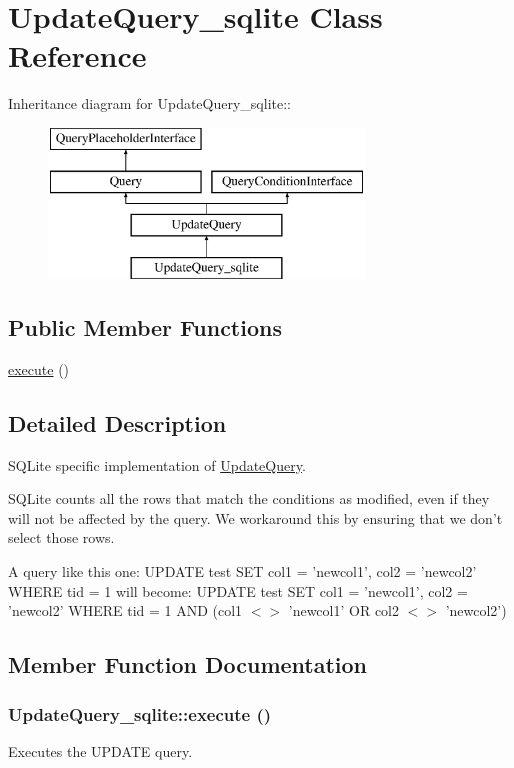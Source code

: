 \hypertarget{classUpdateQuery__sqlite}{
\section{UpdateQuery\_\-sqlite Class Reference}
\label{classUpdateQuery__sqlite}
}
Inheritance diagram for UpdateQuery\_\-sqlite::\begin{figure}[H]
\begin{center}
\leavevmode
\includegraphics[height=4cm]{classUpdateQuery__sqlite}
\end{center}
\end{figure}
\subsection*{Public Member Functions}
\begin{DoxyCompactItemize}
\item 
\hyperlink{classUpdateQuery__sqlite_a7919e3bbb318f3dba23570dbdda80fd6}{execute} ()
\end{DoxyCompactItemize}


\subsection{Detailed Description}
SQLite specific implementation of \hyperlink{classUpdateQuery}{UpdateQuery}.

SQLite counts all the rows that match the conditions as modified, even if they will not be affected by the query. We workaround this by ensuring that we don't select those rows.

A query like this one: UPDATE test SET col1 = 'newcol1', col2 = 'newcol2' WHERE tid = 1 will become: UPDATE test SET col1 = 'newcol1', col2 = 'newcol2' WHERE tid = 1 AND (col1 $<$$>$ 'newcol1' OR col2 $<$$>$ 'newcol2') 

\subsection{Member Function Documentation}
\hypertarget{classUpdateQuery__sqlite_a7919e3bbb318f3dba23570dbdda80fd6}{
\subsubsection[{execute}]{\setlength{\rightskip}{0pt plus 5cm}UpdateQuery\_\-sqlite::execute ()}}
\label{classUpdateQuery__sqlite_a7919e3bbb318f3dba23570dbdda80fd6}
Executes the UPDATE query.

